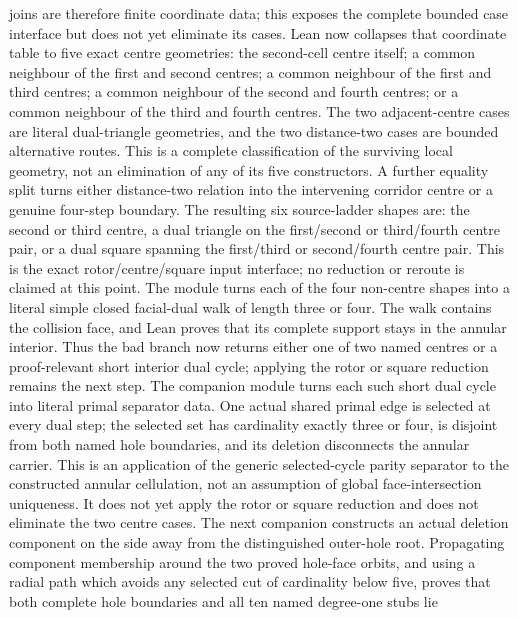 \documentclass[11pt]{article}
\theoremstyle{definition}
\begin{document}
joins are therefore finite coordinate data; this exposes the complete bounded
case interface but does not yet eliminate its cases.  Lean now collapses that
coordinate table to five exact centre geometries: the second-cell centre
itself; a common neighbour of the first and second centres; a common neighbour
of the first and third centres; a common neighbour of the second and fourth
centres; or a common neighbour of the third and fourth centres.  The two
adjacent-centre cases are literal dual-triangle geometries, and the two
distance-two cases are bounded alternative routes.  This is a complete
classification of the surviving local geometry, not an elimination of any
of its five constructors.  A further equality split turns either
distance-two relation into the intervening corridor centre or a genuine
four-step boundary.  The resulting six source-ladder shapes are: the second
or third centre, a dual triangle on the first/second or third/fourth centre
pair, or a dual square spanning the first/third or second/fourth centre pair.
This is the exact rotor/centre/square input interface; no reduction or reroute
is claimed at this point.  The module
 turns
each of the four non-centre shapes into a literal simple closed facial-dual
walk of length three or four.  The walk contains the collision face, and Lean
proves that its complete support stays in the annular interior.  Thus the bad
branch now returns either one of two named centres or a proof-relevant short
interior dual cycle; applying the rotor or square reduction remains the next
step.  The companion module
turns each such short dual cycle into literal primal separator data.  One
actual shared primal edge is selected at every dual step; the selected set has
cardinality exactly three or four, is disjoint from both named hole
boundaries, and its deletion disconnects the annular carrier.  This is an
application of the generic selected-cycle parity separator to the constructed
annular cellulation, not an assumption of global face-intersection uniqueness.
It does not yet apply the rotor or square reduction and does not eliminate the
two centre cases.  The next companion constructs an actual deletion component
on the side away from the distinguished outer-hole root.  Propagating
component membership around the two proved hole-face orbits, and using a
radial path which avoids any selected cut of cardinality below five, proves
that both complete hole boundaries and all ten named degree-one stubs lie
\end{document}
